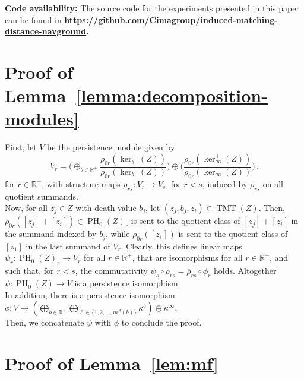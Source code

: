 \documentclass{article}
\DeclareMathOperator{\PH}{PH}
\DeclareMathOperator{\TMT}{TMT}
\newcommand{\R}{\mathbb{R}^+}
\newcommand{\scst}{\scriptscriptstyle}
\newcommand{\mZ}{m^{\scst Z}}
\newcommand{\kb}{\kappa^b}
\newcommand{\kinfty}{\kappa^\infty}
\begin{document}
\noindent
{\bf Code availability:}
The source code for the experiments  presented in this paper can be found in {\bf \href{https://github.com/Cimagroup/induced-matching-distance-navground}{https://github.com/Cimagroup/induced-matching-distance-navground}.}



\appendix

\section{Proof of Lemma~\ref{lemma:decomposition-modules}}\label{prooflemma:decomposition-modules}

  
   
First, let 
    $V$ be the persistence module given by 
   \[
    V_r=\Bigg(\oplus_{b \in \R}  \dfrac{\rho_{0r}(\ker^+_b(Z))}{\rho_{0r}(\ker^-_b(Z))}\Bigg) 
    \oplus 
    \Bigg( \dfrac{\rho_{0r}(\ker^+_\infty(Z))}{\rho_{0r}(\ker^-_\infty(Z))}\Bigg)
    \,.
    \]
    for $r \in \R$, with structure maps $\overline{\rho}_{rs}\colon V_r\rightarrow V_s$, for $r<s$, induced by $\rho_{rs}$ on all quotient summands.
    \\
    Now, for all $z_j \in Z$
   with death value %
   $b_j$,
   let $(z_j,b_j,z_i)\in\TMT(Z)$. 
   Then, 
   $\rho_{0r}([z_j]+[z_i]) \in \PH_0(Z)_r$ is sent
    to the 
    quotient 
    class 
    of 
    $[z_j]+[z_i]$ in the summand indexed by $b_j$, while $\rho_{0r}([z_1])$ is sent to the quotient class of $[z_1]$ in the last summand of $V_r$.
    Clearly, this defines linear maps $\psi_r\colon\PH_0(Z)_r \rightarrow V_r$ for all $r \in \R$, 
  that are isomorphisms for all $r\in\R$, and
    such 
    that, for $r<s$, the commutativity $\psi_s \circ \rho_{rs} = \overline{\rho}_{rs}\circ \phi_r$ holds.
            Altogether $\psi\colon \PH_0(Z)\rightarrow V$ is a persistence 
    isomorphism.
    \\
  In addition, there is a persistence isomorphism 
$\phi:     V\to
    \left(\bigoplus_{b \in \R} \bigoplus_{\ell \in 
    \{1,2,\dots,\mZ(b)\}} \kb\right) 
    \oplus 
    \kinfty$.
    \\
    Then,
     we concatenate  $\psi$ with
     $\phi$
       to conclude the proof.

\section{Proof of Lemma~\ref{lem:mf}}\label{prooflem:mf}
\end{document}
